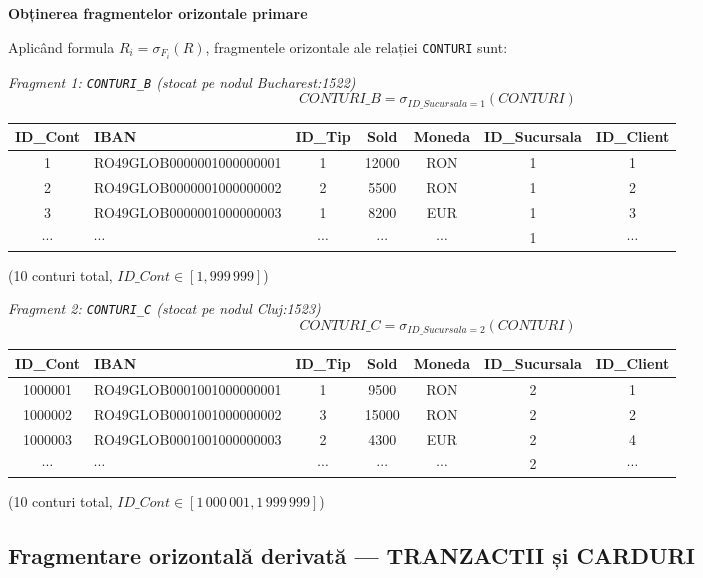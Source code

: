 \documentclass[12pt,a4paper]{article}
\begin{document}
\textbf{Obținerea fragmentelor orizontale primare}

Aplicând formula $R_i = \sigma_{F_i}(R)$, fragmentele orizontale ale relației \texttt{CONTURI} sunt:

\textit{Fragment 1: \texttt{CONTURI\_B} (stocat pe nodul Bucharest:1522)}
\[ CONTURI\_B = \sigma_{ID\_Sucursala=1}(CONTURI) \]

\begin{center}
\small
\begin{tabular}{c|l|c|c|c|c|c}
\toprule
ID\_Cont & IBAN & ID\_Tip & Sold & Moneda & ID\_Sucursala & ID\_Client \\
\midrule
1 & RO49GLOB0000001000000001 & 1 & 12000 & RON & 1 & 1 \\
2 & RO49GLOB0000001000000002 & 2 &  5500 & RON & 1 & 2 \\
3 & RO49GLOB0000001000000003 & 1 &  8200 & EUR & 1 & 3 \\
$\cdots$ & $\cdots$ & $\cdots$ & $\cdots$ & $\cdots$ & 1 & $\cdots$ \\
\bottomrule
\end{tabular}
\end{center}
(10 conturi total, $ID\_Cont \in [1, 999\,999]$)

\textit{Fragment 2: \texttt{CONTURI\_C} (stocat pe nodul Cluj:1523)}
\[ CONTURI\_C = \sigma_{ID\_Sucursala=2}(CONTURI) \]

\begin{center}
\small
\begin{tabular}{c|l|c|c|c|c|c}
\toprule
ID\_Cont & IBAN & ID\_Tip & Sold & Moneda & ID\_Sucursala & ID\_Client \\
\midrule
1000001 & RO49GLOB0001001000000001 & 1 &  9500 & RON & 2 & 1 \\
1000002 & RO49GLOB0001001000000002 & 3 & 15000 & RON & 2 & 2 \\
1000003 & RO49GLOB0001001000000003 & 2 &  4300 & EUR & 2 & 4 \\
$\cdots$ & $\cdots$ & $\cdots$ & $\cdots$ & $\cdots$ & 2 & $\cdots$ \\
\bottomrule
\end{tabular}
\end{center}
(10 conturi total, $ID\_Cont \in [1\,000\,001, 1\,999\,999]$)

\subsection{Fragmentare orizontală derivată — TRANZACTII și CARDURI}
\end{document}
